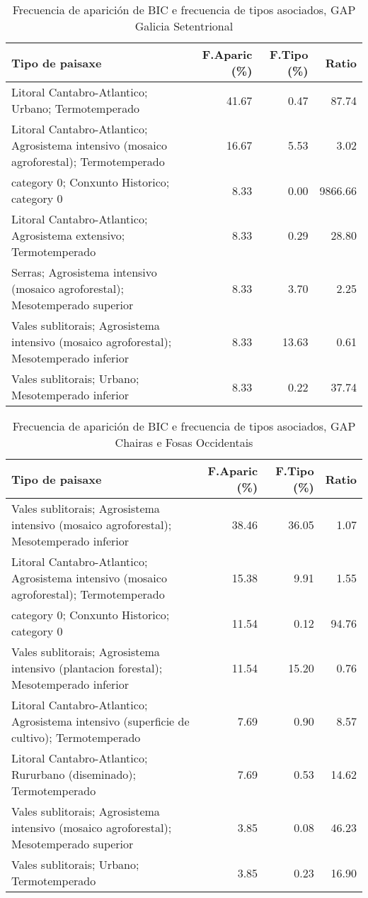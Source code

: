 \begin{table}[p]
\centering
\caption{Frecuencia de aparición de BIC e frecuencia de tipos asociados, GAP Galicia Setentrional} 
\label{vbic10}
\begin{tabular}{lrrr}
  \hline
Tipo de paisaxe & F.Aparic (\%) & F.Tipo (\%) & Ratio \\ 
  \hline
Litoral Cantabro-Atlantico; Urbano; Termotemperado & 41.67 & 0.47 & 87.74 \\ 
  Litoral Cantabro-Atlantico; Agrosistema intensivo (mosaico agroforestal); Termotemperado & 16.67 & 5.53 & 3.02 \\ 
  category 0; Conxunto Historico; category 0 & 8.33 & 0.00 & 9866.66 \\ 
  Litoral Cantabro-Atlantico; Agrosistema extensivo; Termotemperado & 8.33 & 0.29 & 28.80 \\ 
  Serras; Agrosistema intensivo (mosaico agroforestal); Mesotemperado superior & 8.33 & 3.70 & 2.25 \\ 
  Vales sublitorais; Agrosistema intensivo (mosaico agroforestal); Mesotemperado inferior & 8.33 & 13.63 & 0.61 \\ 
  Vales sublitorais; Urbano; Mesotemperado inferior & 8.33 & 0.22 & 37.74 \\ 
   \hline
\end{tabular}
\end{table}
\begin{table}[p]
\centering
\caption{Frecuencia de aparición de BIC e frecuencia de tipos asociados, GAP Chairas e Fosas Occidentais} 
\label{vbic11}
\begin{tabular}{lrrr}
  \hline
Tipo de paisaxe & F.Aparic (\%) & F.Tipo (\%) & Ratio \\ 
  \hline
Vales sublitorais; Agrosistema intensivo (mosaico agroforestal); Mesotemperado inferior & 38.46 & 36.05 & 1.07 \\ 
  Litoral Cantabro-Atlantico; Agrosistema intensivo (mosaico agroforestal); Termotemperado & 15.38 & 9.91 & 1.55 \\ 
  category 0; Conxunto Historico; category 0 & 11.54 & 0.12 & 94.76 \\ 
  Vales sublitorais; Agrosistema intensivo (plantacion forestal); Mesotemperado inferior & 11.54 & 15.20 & 0.76 \\ 
  Litoral Cantabro-Atlantico; Agrosistema intensivo (superficie de cultivo); Termotemperado & 7.69 & 0.90 & 8.57 \\ 
  Litoral Cantabro-Atlantico; Rururbano (diseminado); Termotemperado & 7.69 & 0.53 & 14.62 \\ 
  Vales sublitorais; Agrosistema intensivo (mosaico agroforestal); Mesotemperado superior & 3.85 & 0.08 & 46.23 \\ 
  Vales sublitorais; Urbano; Termotemperado & 3.85 & 0.23 & 16.90 \\ 
   \hline
\end{tabular}
\end{table}
